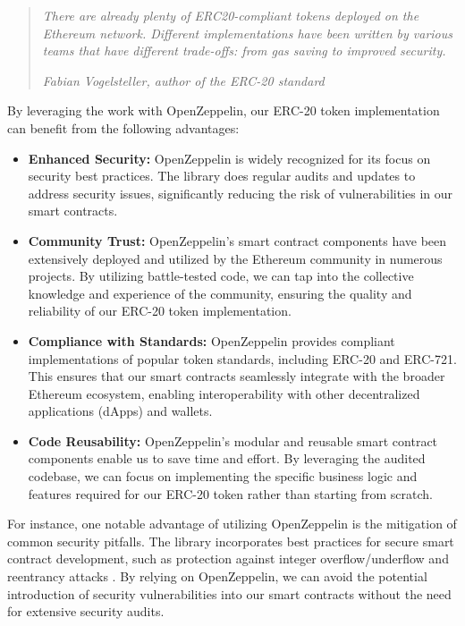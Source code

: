 \begin{quote}
   \textit{There are already plenty of ERC20-compliant tokens deployed on the Ethereum network. Different implementations have been written by various teams that have different trade-offs: from gas saving to improved security.}


   \textit{Fabian Vogelsteller, author of the ERC-20 standard}
\end{quote}


By leveraging the work with OpenZeppelin, our ERC-20 token implementation can benefit from the following advantages:
\begin{itemize}
\item \textbf{Enhanced Security:} OpenZeppelin is widely recognized for its focus on security best practices. The library does regular audits and updates to address security issues, significantly reducing the risk of vulnerabilities in our smart contracts.
\item \textbf{Community Trust:} OpenZeppelin's smart contract components have been extensively deployed and utilized by the Ethereum community in numerous projects. By utilizing battle-tested code, we can tap into the collective knowledge and experience of the community, ensuring the quality and reliability of our ERC-20 token implementation.
\item \textbf{Compliance with Standards:} OpenZeppelin provides compliant implementations of popular token standards, including ERC-20 and ERC-721. This ensures that our smart contracts seamlessly integrate with the broader Ethereum ecosystem, enabling interoperability with other decentralized applications (dApps) and wallets.
\item \textbf{Code Reusability:} OpenZeppelin's modular and reusable smart contract components enable us to save time and effort. By leveraging the audited codebase, we can focus on implementing the specific business logic and features required for our ERC-20 token rather than starting from scratch.
\end{itemize}
For instance, one notable advantage of utilizing OpenZeppelin is the mitigation of common security pitfalls. The library incorporates best practices for secure smart contract development, 
such as protection against integer overflow/underflow and reentrancy attacks \cite{solidity_reeantrency_attack}. By relying on OpenZeppelin, we can avoid the potential introduction of 
security vulnerabilities into our smart contracts without the need for extensive security audits.

